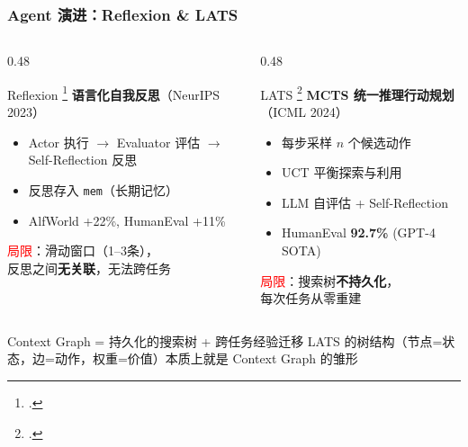 \documentclass[aspectratio=169,10pt]{beamer}
\let\oldcite\cite
\renewcommand{\cite}[1]{\oldcite{#1}\footcitetext{#1}}
\begin{document}
\begin{frame}
  \frametitle{Agent 演进：Reflexion \& LATS}

  \begin{columns}[T]
    \begin{column}{0.48\textwidth}
      \begin{block}{Reflexion \cite{shinn2023reflexion}}
        \small
        \textbf{语言化自我反思}（NeurIPS 2023）
        \begin{itemize}
          \item Actor 执行 $\rightarrow$ Evaluator 评估 $\rightarrow$ Self-Reflection 反思
          \item 反思存入 \texttt{mem}（长期记忆）
          \item AlfWorld +22\%, HumanEval +11\%
        \end{itemize}
        \vspace{0.1cm}
        \textcolor{red}{局限}：滑动窗口（1--3条），\\反思之间\textbf{无关联}，无法跨任务
      \end{block}
    \end{column}

    \begin{column}{0.48\textwidth}
      \begin{block}{LATS \cite{zhou2024lats}}
        \small
        \textbf{MCTS 统一推理行动规划}（ICML 2024）
        \begin{itemize}
          \item 每步采样 $n$ 个候选动作
          \item UCT 平衡探索与利用
          \item LLM 自评估 + Self-Reflection
          \item HumanEval \textbf{92.7\%} (GPT-4 SOTA)
        \end{itemize}
        \vspace{0.1cm}
        \textcolor{red}{局限}：搜索树\textbf{不持久化}，\\每次任务从零重建
      \end{block}
    \end{column}
  \end{columns}

  \vspace{0.2cm}

  \begin{alertblock}{Context Graph = 持久化的搜索树 + 跨任务经验迁移}
    LATS 的树结构（节点=状态，边=动作，权重=价值）本质上就是 Context Graph 的雏形
  \end{alertblock}
\end{frame}
\end{document}

